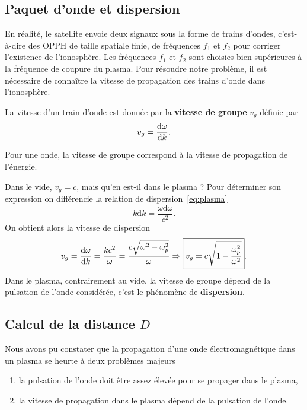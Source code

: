 \subsection{Paquet d'onde et dispersion}
En réalité, le satellite envoie deux signaux sous la forme de trains d'ondes, c'est-à-dire
des OPPH de taille spatiale finie, de fréquences $f_1$ et $f_2$ pour corriger
l'existence de l'ionosphère. Les fréquences $f_1$ et $f_2$ sont choisies bien supérieures
à la fréquence de coupure du plasma. Pour résoudre
notre problème, il est nécessaire de connaître la vitesse de propagation
des trains d'onde dans l'ionosphère.


La vitesse d'un train d'onde est donnée par la \textbf{vitesse de groupe} $v_g$
définie par 
\begin{equation*}
	v_g = \dfrac{\mathrm{d} \omega}{\mathrm{d} k}.
\end{equation*}

\begin{rema}
	Pour une onde, la vitesse de groupe correspond à la vitesse de 
	propagation de l'énergie.
\end{rema}

Dans le vide, $v_g = c$, mais qu'en est-il dans le plasma ? Pour déterminer son 
expression on différencie la relation de dispersion~\ref{eq:plasma}
\begin{equation*}
	k \mathrm{d}k = \dfrac{\omega \mathrm{d}\omega}{c^2}.
\end{equation*}
On obtient alors la vitesse de dispersion
\begin{equation*}
	v_g = \dfrac{\mathrm{d} \omega}{\mathrm{d} k} = \dfrac{k c^2}{\omega} = \dfrac{c \sqrt{\omega^2
	- \omega_p^2}}{\omega} \Rightarrow \boxed{v_g = c 
	\sqrt{1 - \dfrac{\omega_p^2}{\omega^2}}}.
\end{equation*}
Dans le plasma, contrairement au vide, la vitesse de groupe dépend de la pulsation de
l'onde considérée, c'est le phénomène de \textbf{dispersion}.

\subsection{Calcul de la distance $D$}
Nous avons pu constater que la propagation d'une onde électromagnétique dans 
un plasma se heurte à deux problèmes majeurs
\begin{enumerate}
	\item la pulsation de l'onde doit être assez élevée pour se propager
	  dans le plasma,
	\item la vitesse de propagation dans le plasma dépend de la pulsation de
	  l'onde.
\end{enumerate}

